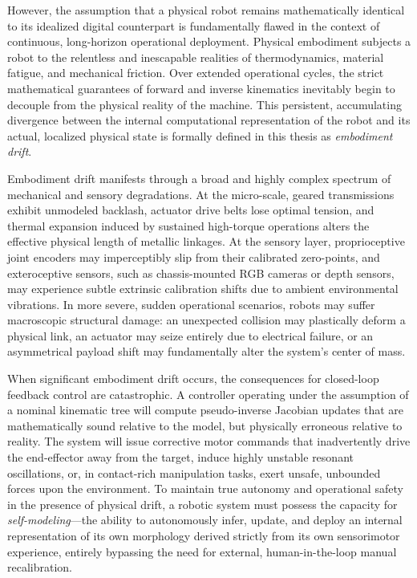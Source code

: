 \documentclass[12pt,a4paper,oneside]{report}
\begin{document}
However, the assumption that a physical robot remains mathematically identical to its idealized digital counterpart is fundamentally flawed in the context of continuous, long-horizon operational deployment. Physical embodiment subjects a robot to the relentless and inescapable realities of thermodynamics, material fatigue, and mechanical friction. Over extended operational cycles, the strict mathematical guarantees of forward and inverse kinematics inevitably begin to decouple from the physical reality of the machine. This persistent, accumulating divergence between the internal computational representation of the robot and its actual, localized physical state is formally defined in this thesis as \textit{embodiment drift}. 

Embodiment drift manifests through a broad and highly complex spectrum of mechanical and sensory degradations. At the micro-scale, geared transmissions exhibit unmodeled backlash, actuator drive belts lose optimal tension, and thermal expansion induced by sustained high-torque operations alters the effective physical length of metallic linkages. At the sensory layer, proprioceptive joint encoders may imperceptibly slip from their calibrated zero-points, and exteroceptive sensors, such as chassis-mounted RGB cameras or depth sensors, may experience subtle extrinsic calibration shifts due to ambient environmental vibrations. In more severe, sudden operational scenarios, robots may suffer macroscopic structural damage: an unexpected collision may plastically deform a physical link, an actuator may seize entirely due to electrical failure, or an asymmetrical payload shift may fundamentally alter the system's center of mass.

When significant embodiment drift occurs, the consequences for closed-loop feedback control are catastrophic. A controller operating under the assumption of a nominal kinematic tree will compute pseudo-inverse Jacobian updates that are mathematically sound relative to the model, but physically erroneous relative to reality. The system will issue corrective motor commands that inadvertently drive the end-effector away from the target, induce highly unstable resonant oscillations, or, in contact-rich manipulation tasks, exert unsafe, unbounded forces upon the environment. To maintain true autonomy and operational safety in the presence of physical drift, a robotic system must possess the capacity for \textit{self-modeling}—the ability to autonomously infer, update, and deploy an internal representation of its own morphology derived strictly from its own sensorimotor experience, entirely bypassing the need for external, human-in-the-loop manual recalibration.
\end{document}
